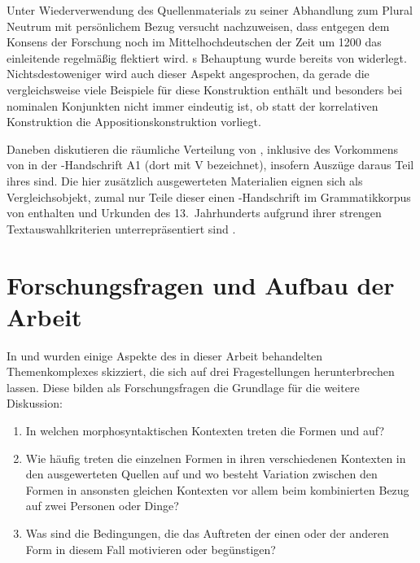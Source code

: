Unter Wiederverwendung des Quellenmaterials zu seiner Abhandlung zum Plural
Neutrum mit persönlichem Bezug \autocite{askedal1973} versucht
\citet{askedal1974} nachzuweisen, dass entgegen dem Konsens der Forschung
\autocites[vgl.~z.\,B.][433]{behaghel1923}[133]{dal2014}[626]{ksw2} noch im
Mittelhochdeutschen der Zeit um 1200 das einleitende
 regelmäßig flektiert wird. \citeauthor{askedal1974}s Behauptung
wurde bereits von \citet{gjelsten1980} widerlegt. Nichtsdestoweniger wird auch
dieser Aspekt angesprochen, da gerade die \KC{} vergleichsweise viele Beispiele
für diese Konstruktion enthält und besonders bei nominalen Konjunkten nicht
immer eindeutig ist, ob statt der korrelativen Konstruktion die
Appositionskonstruktion 
vorliegt.

Daneben diskutieren \citet[627--628]{ksw2} die räumliche
Verteilung von ,
inklusive des Vorkommens von  in der \KC{}-Handschrift A1 (dort mit
V bezeichnet), insofern Auszüge daraus Teil ihres  sind. Die hier
zusätzlich ausgewerteten Materialien eignen sich als Vergleichsobjekt, zumal
nur Teile dieser einen \KC{}-Handschrift im Grammatikkorpus von
\citet{ksw3,ksw2} enthalten und Urkunden des 13.~Jahrhunderts aufgrund ihrer
strengen Text\-auswahl\-kriterien unterrepräsentiert sind \autocite[1309,
1311]{wegera2000}.


\section{Forschungsfragen und Aufbau der Arbeit}

In  und  wurden einige
Aspekte des in dieser Arbeit behandelten Themenkomplexes skizziert, die sich
auf drei Fragestellungen herunterbrechen lassen. Diese bilden als
Forschungsfragen die Grundlage für die weitere Diskussion:

\begin{enumerate}
	\item In welchen morphosyntaktischen Kontexten treten die Formen
		 und  auf?
	\item Wie häufig treten die einzelnen Formen in ihren verschiedenen
		Kontexten in den ausgewerteten Quellen auf und wo besteht Variation
		zwischen den Formen in ansonsten gleichen Kontexten vor allem beim
		kombinierten Bezug auf zwei Personen oder Dinge?
	\item Was sind die Bedingungen, die das Auftreten der einen
		oder der anderen Form in diesem Fall motivieren oder begünstigen?
\end{enumerate}


